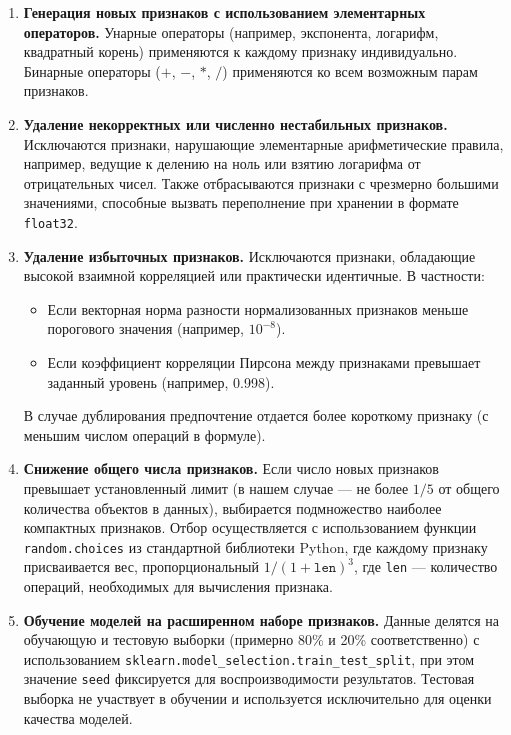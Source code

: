 \documentclass[a4paper,12pt]{article}
\begin{document}
    \begin{enumerate}
      \item \textbf{Генерация новых признаков с использованием элементарных операторов.}
      Унарные операторы (например, экспонента, логарифм, квадратный корень) применяются к каждому признаку индивидуально. Бинарные операторы ($+$, $-$, $*$, $/$) применяются ко всем возможным парам признаков.
      
      \item \textbf{Удаление некорректных или численно нестабильных признаков.}
      Исключаются признаки, нарушающие элементарные арифметические правила, например, ведущие к делению на ноль или взятию логарифма от отрицательных чисел. Также отбрасываются признаки с чрезмерно большими значениями, способные вызвать переполнение при хранении в формате \texttt{float32}.
      
      \item \textbf{Удаление избыточных признаков.}
      Исключаются признаки, обладающие высокой взаимной корреляцией или практически идентичные. В частности:
      \begin{itemize}
      \item Если векторная норма разности нормализованных признаков меньше порогового значения (например, $10^{-8}$).
      \item Если коэффициент корреляции Пирсона между признаками превышает заданный уровень (например, 0.998).
      \end{itemize}
      В случае дублирования предпочтение отдается более короткому признаку (с меньшим числом операций в формуле).
      
      \item \textbf{Снижение общего числа признаков.}
      Если число новых признаков превышает установленный лимит (в нашем случае --- не более $1/5$ от общего количества объектов в данных), выбирается подмножество наиболее компактных признаков.
      Отбор осуществляется с использованием функции \texttt{random.choices} из стандартной библиотеки Python, где каждому признаку присваивается вес, пропорциональный $1/(1 + \texttt{len})^3$, где \texttt{len} --- количество операций, необходимых для вычисления признака.
      
      \item \textbf{Обучение моделей на расширенном наборе признаков.}
      Данные делятся на обучающую и тестовую выборки (примерно 80\% и 20\% соответственно) с использованием \texttt{sklearn.model\_selection.train\_test\_split}, при этом значение \texttt{seed} фиксируется для воспроизводимости результатов. Тестовая выборка не участвует в обучении и используется исключительно для оценки качества моделей.
      

\end{enumerate}
\end{document}
